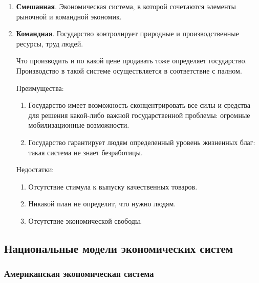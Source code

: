 \documentclass[12pt]{article}
\begin{document}
\begin{enumerate}
		Способы государственного вмешательства:
		\begin{itemize}
			\item Лицензирование.
			\item Кредитно-финансовая политика.
			\item Создание правовой базы для рыночной экономики.
			\item Создание технических условий, которым должен отвечать товар.
		\end{itemize}
		
		\item \textbf{Смешанная}. Экономическая система, в которой сочетаются элементы рыночной и командной экономик.
		
		\item \textbf{Командная}. Государство контролирует природные и производственные ресурсы, труд людей.
		
		Что производить и по какой цене продавать тоже определяет государство. Производство в такой системе осуществляется в соответствие с палном.
		
		Преимущества:
		\begin{enumerate}
			\item Государство имеет возможность сконцентрировать все силы и средства для решения какой-либо важной государственной проблемы: огромные мобилизационные возможности.
			\item Государство гарантирует людям определенный уровень жизненных благ: такая система не знает безработицы.
		\end{enumerate}
		
		Недостатки:
		\begin{enumerate}
			\item Отсутствие стимула к выпуску качественных товаров.
			\item Никакой план не определит, что нужно людям.
			\item Отсутствие экономической свободы.
		\end{enumerate}
	\end{enumerate}
	
	\subsection{Национальные модели экономических систем}
	
	\subsubsection{Американская экономическая система}
	
\end{document}
